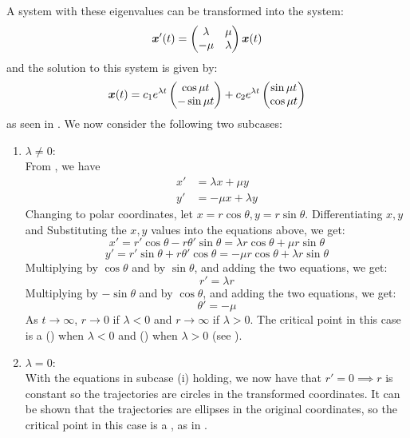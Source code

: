 \begin{itemize}
	A system with these eigenvalues can be transformed into the system:
	\begin{equation}\label{3.6}
		\bm{x}'(t) = \begin{pmatrix} \lambda & \mu \\ -\mu & \lambda\end{pmatrix} \bm{x}(t)
	\end{equation} 
	and the solution to this system is given by:
	\[
		\bm{x}(t) = c_1 e^{\lambda t} \begin{pmatrix}\cos{\mu t} \\ -\sin{\mu t}\end{pmatrix} + c_2 e^{\lambda t} \begin{pmatrix}\sin{\mu t} \\ \cos{\mu t}\end{pmatrix} 
	\]
	as seen in . We now consider the following two subcases: 
	\begin{enumerate}[label=(\roman*)]
		\item $\lambda \neq 0$: \\ 
		From , we have 
		\begin{align*}
			x' &= \lambda x + \mu y \\
			y' &= -\mu x + \lambda y
		\end{align*}
		Changing to polar coordinates, let $x= r \cos{\theta}, y = r \sin{\theta}$. Differentiating $x,y$ and Substituting the $x,y$ values into the equations above, we get: 
		\begin{equation}\label{eq3.7}
			x' = r'\cos{\theta} - r\theta'\sin{\theta} = \lambda r \cos{\theta} + \mu r\sin{\theta}
		\end{equation}
		\begin{equation}\label{eq3.8}
			y' = r'\sin{\theta} + r\theta'\cos{\theta} = -\mu r \cos{\theta} + \lambda r\sin{\theta}
		\end{equation}
		Multiplying  by $\cos{\theta}$ and  by $\sin{\theta}$, and adding the two equations, we get: 
		\[
		r' = \lambda r
		\]
		Multiplying  by $-\sin{\theta}$ and  by $\cos{\theta}$, and adding the two equations, we get: 
		\[
		\theta' = -\mu
		\]
		As $t \to \infty$, $r \to 0$ if $\lambda<0$ and $r \to \infty$ if $\lambda>0$. 
		The critical point in this case is a  () when $\lambda<0$ and  () when $\lambda>0$ (see ). 
		
		\item $\lambda = 0$: \\
		With the equations in subcase (i) holding, we now have that $r'=0 \implies r$ is constant so the trajectories are circles in the transformed coordinates. It can be shown that the trajectories are ellipses in the original coordinates, so the critical point in this case is a , as in .
	\end{enumerate}


\end{itemize}
